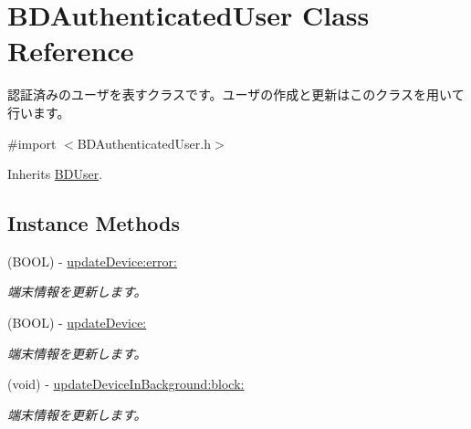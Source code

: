 \hypertarget{interface_b_d_authenticated_user}{\section{B\-D\-Authenticated\-User Class Reference}
\label{interface_b_d_authenticated_user}
}


認証済みのユーザを表すクラスです。ユーザの作成と更新はこのクラスを用いて行います。  




{\ttfamily \#import $<$B\-D\-Authenticated\-User.\-h$>$}



Inherits \hyperlink{interface_b_d_user}{B\-D\-User}.

\subsection*{Instance Methods}
\begin{DoxyCompactItemize}
\item 
(B\-O\-O\-L) -\/ \hyperlink{interface_b_d_authenticated_user_a62dd555b26faa4cdf2a619a3be2f08e9}{update\-Device\-:error\-:}
\begin{DoxyCompactList}\small\item\em 端末情報を更新します。 \end{DoxyCompactList}\item 
(B\-O\-O\-L) -\/ \hyperlink{interface_b_d_authenticated_user_a1e0ec3e8cf7bb54970fbe698c79ff404}{update\-Device\-:}
\begin{DoxyCompactList}\small\item\em 端末情報を更新します。 \end{DoxyCompactList}\item 
(void) -\/ \hyperlink{interface_b_d_authenticated_user_ad79404b21ac78fe5345c33460d490e0e}{update\-Device\-In\-Background\-:block\-:}
\begin{DoxyCompactList}\small\item\em 端末情報を更新します。 \end{DoxyCompactList}\end{DoxyCompactItemize}
